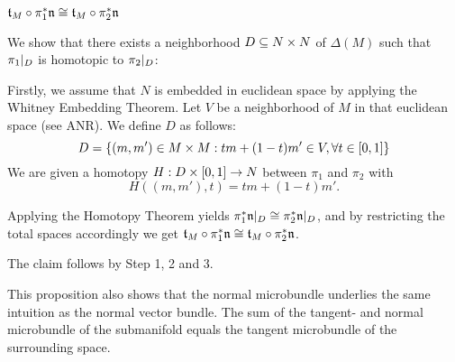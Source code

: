 \begin{myproof}
\begin{steps}
        \item $\mathfrak{t}_M \circ \pi_1^*\mathfrak{n} \cong \mathfrak{t}_M \circ \pi_2^*\mathfrak{n}$
        
        We show that there exists a neighborhood $D \subseteq{} N \times N$ of $\Delta(M)$ such that
        $\pi_1\vert_{D}$ is homotopic to $\pi_2\vert_{D}$:

        Firstly, we assume that $N$ is embedded in euclidean space by applying the Whitney Embedding Theorem.
        Let $V$ be a neighborhood of $M$ in that euclidean space (see ANR).
        We define $D$ as follows:
        \[ D = \{(m, m') \in M \times M: tm + (1 - t)m' \in V, \forall t \in [0, 1]\} \]
        We are given a homotopy $H: D \times{} [0, 1] \to N$ between $\pi_1$ and $\pi_2$ with
        \[ H((m, m'), t) = tm + (1 - t)m'. \]

        Applying the Homotopy Theorem yields $\pi_1^*\mathfrak{n}\vert_{D} \cong \pi_2^*\mathfrak{n}\vert_{D}$, and
        by restricting the total spaces accordingly we get
        $\mathfrak{t}_M \circ \pi_1^*\mathfrak{n} \cong \mathfrak{t}_M \circ \pi_2^*\mathfrak{n}$.
    \end{steps}
    The claim follows by Step 1, 2 and 3.
\end{myproof}

\begin{myparagraph}
    This proposition also shows that the normal microbundle
    underlies the same intuition as the normal vector bundle. 
    The sum of the tangent- and normal microbundle of the submanifold
    equals the tangent microbundle of the surrounding space.
\end{myparagraph}